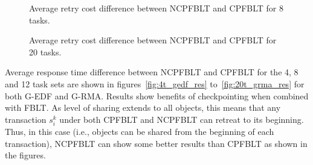 \documentclass[conference]{IEEEtran}
\begin{document}
%
%
\begin{figure}
\centering
{}
\caption{Average retry cost difference between NCPFBLT and CPFBLT for 8 tasks.}
\label{fig:8t_rc}
\end{figure}
%
%
\begin{figure}
\centering
{}
\caption{Average retry cost difference between NCPFBLT and CPFBLT for 20 tasks.}
\label{fig:20t_rc}
\end{figure}
%
Average response time difference between NCPFBLT and CPFBLT for the 4, 8 and 12 task sets are shown in figures~\ref{fig:4t_gedf_res} to~\ref{fig:20t_grma_res} for both G-EDF and G-RMA. Results show benefits of checkpointing when combined with FBLT. As level of sharing extends to all objects, this means that any transaction $s_i^k$ under both CPFBLT and NCPFBLT can retreat to its beginning. Thus, in this case (i.e., objects can be shared from the beginning of each transaction), NCPFBLT can show some better results than CPFBLT as shown in the figures.
\end{document}
